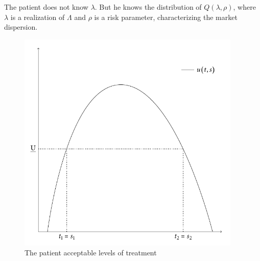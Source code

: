 \documentclass[10pt,a4paper]{article} 					%
\begin{document}
The patient does not know $\lambda$. But he knows the distribution of $Q(\lambda,\rho)$, where $\lambda$ is a realization of $\Lambda$ and $\rho$ is a risk parameter, characterizing the market dispersion. %

\begin{figure}[htbp]
	\centering
	\includegraphics[width=0.95\textwidth]{../fig/acceptable-treatment.pdf}
	\caption{The patient acceptable levels of treatment}\label{fig:acceptable-treatment}
\end{figure}



\printbibliography%


\end{document}
